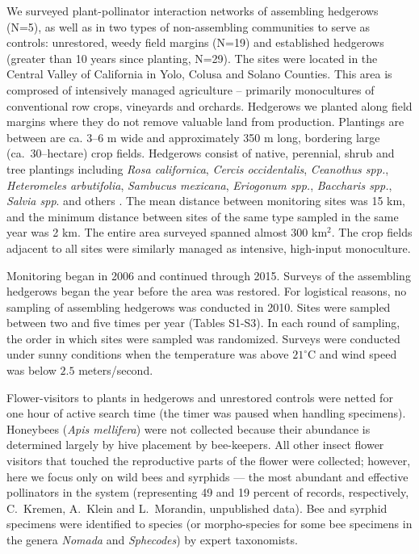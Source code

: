 \documentclass[12pt]{article}
\begin{document}
We surveyed plant-pollinator interaction networks of assembling
hedgerows (N=5), as well as in two types of non-assembling communities
to serve as controls: unrestored, weedy field margins (N=19) and
established hedgerows (greater than 10 years since planting,
N=29). The sites were located in the Central Valley of California in
Yolo, Colusa and Solano Counties. This area is comprosed of
intensively managed agriculture -- primarily monocultures of
conventional row crops, vineyards and orchards. Hedgerows we planted
along field margins where they do not remove valuable land from
production. Plantings are between are ca. 3--6 m wide and
approximately 350 m long, bordering large (ca.\ 30--hectare) crop
fields. Hedgerows consist of native, perennial, shrub and tree
plantings including \textit{Rosa californica}, \textit{Cercis
  occidentalis}, \textit{Ceanothus spp.}, \textit{Heteromeles
  arbutifolia}, \textit{Sambucus mexicana}, \textit{Eriogonum spp.},
\textit{Baccharis spp.}, \textit{Salvia spp}. and others
\citep{kremen-2015-602, mgonigle-2015-x}. The mean distance between
monitoring sites was 15 km, and the minimum distance between sites of
the same type sampled in the same year was 2 km.  The entire area
surveyed spanned almost 300 km$^2$. The crop fields adjacent to all
sites were similarly managed as intensive, high-input monoculture.

Monitoring began in 2006 and continued through 2015. Surveys of the
assembling hedgerows began the year before the area was restored. For
logistical reasons, no sampling of assembling hedgerows was conducted
in 2010. Sites were sampled between two and five times per year
(Tables S1-S3). In each round of sampling, the order in which sites
were sampled was randomized. Surveys were conducted under sunny
conditions when the temperature was above $21^{\circ}\mathrm{C}$ and
wind speed was below $2.5$ meters/second.

Flower-visitors to plants in hedgerows and unrestored controls were
netted for one hour of active search time (the timer was paused when
handling specimens). Honeybees (\textit{Apis mellifera}) were not
collected because their abundance is determined largely by hive
placement by bee-keepers. All other insect flower visitors that
touched the reproductive parts of the flower were collected; however,
here we focus only on wild bees and syrphids --- the most abundant and
effective pollinators in the system (representing 49 and 19 percent of
records, respectively, C.~Kremen, A.~Klein and L.~Morandin,
unpublished data). Bee and syrphid specimens were identified to
species (or morpho-species for some bee specimens in the genera
\textit{Nomada} and \textit{Sphecodes}) by expert taxonomists.
\end{document}
